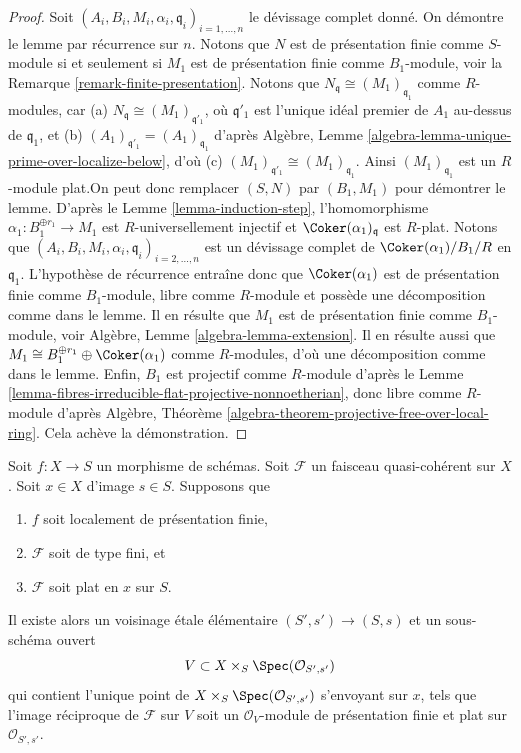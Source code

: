 \begin{proof}
Soit $(A_i, B_i, M_i, \alpha_i, \mathfrak q_i)_{i = 1, \ldots, n}$
le d\'evissage complet donné. On démontre le lemme par récurrence sur $n$.
Notons que $N$ est de présentation finie comme $S$-module si et seulement si
$M_1$ est de présentation finie comme $B_1$-module, voir
la Remarque \ref{remark-finite-presentation}.
Notons que $N_{\mathfrak q} \cong (M_1)_{\mathfrak q_1}$ comme $R$-modules,
car (a) $N_{\mathfrak q} \cong (M_1)_{\mathfrak q'_1}$, où
$\mathfrak q'_1$ est l'unique idéal premier de $A_1$ au-dessus de $\mathfrak q_1$,
et (b) $(A_1)_{\mathfrak q'_1} = (A_1)_{\mathfrak q_1}$ d'après
Algèbre, Lemme \ref{algebra-lemma-unique-prime-over-localize-below},
d'où (c) $(M_1)_{\mathfrak q'_1} \cong (M_1)_{\mathfrak q_1}$.
Ainsi $(M_1)_{\mathfrak q_1}$ est un $R$-module plat.\newline On peut donc remplacer
$(S, N)$ par $(B_1, M_1)$ pour démontrer le lemme. D'après le
Lemme \ref{lemma-induction-step},
l'homomorphisme $\alpha_1 : B_1^{\oplus r_1} \to M_1$ est $R$-universellement injectif
et $\Coker(\alpha_1)_{\mathfrak q}$ est $R$-plat.
Notons que $(A_i, B_i, M_i, \alpha_i, \mathfrak q_i)_{i = 2, \ldots, n}$
est un d\'evissage complet de $\Coker(\alpha_1)/B_1/R$ en
$\mathfrak q_1$. L'hypothèse de récurrence
entraîne donc que $\Coker(\alpha_1)$ est de présentation finie comme
$B_1$-module, libre comme $R$-module et possède une décomposition comme dans le lemme.
Il en résulte que $M_1$ est de présentation finie comme $B_1$-module, voir
Algèbre, Lemme \ref{algebra-lemma-extension}.
Il en résulte aussi que
$M_1 \cong B_1^{\oplus r_1} \oplus \Coker(\alpha_1)$
comme $R$-modules, d'où une décomposition comme dans le lemme.
Enfin, $B_1$ est projectif comme $R$-module d'après le
Lemme \ref{lemma-fibres-irreducible-flat-projective-nonnoetherian},
donc libre comme $R$-module d'après
Algèbre, Théorème \ref{algebra-theorem-projective-free-over-local-ring}.
Cela achève la démonstration.
\end{proof}

\begin{proposition}
\label{proposition-finite-type-flat-at-point}
Soit $f : X \to S$ un morphisme de schémas.
Soit $\mathcal{F}$ un faisceau quasi-cohérent sur $X$.
Soit $x \in X$ d'image $s \in S$.
Supposons que
\begin{enumerate}
\item $f$ soit localement de présentation finie,
\item $\mathcal{F}$ soit de type fini, et
\item $\mathcal{F}$ soit plat en $x$ sur $S$.
\end{enumerate}
Il existe alors un voisinage \'etale élémentaire $(S', s') \to (S, s)$
et un sous-schéma ouvert
$$
V \subset X \times_S \Spec(\mathcal{O}_{S', s'})
$$
qui contient l'unique point de
$X \times_S \Spec(\mathcal{O}_{S', s'})$ s'envoyant sur $x$,
tels que l'image réciproque de $\mathcal{F}$ sur $V$ soit un $\mathcal{O}_V$-module
de présentation finie et plat sur $\mathcal{O}_{S', s'}$.
\end{proposition}

